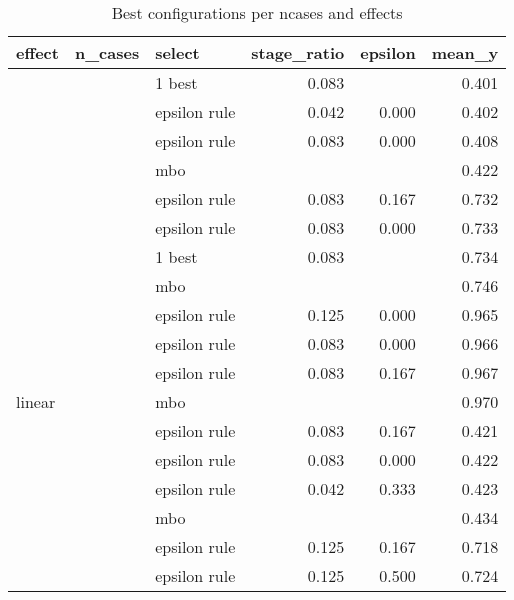 \begin{table}

\caption{\label{tab:table_best}Best configurations per ncases and effects}
\centering
\fontsize{6}{8}\selectfont
\begin{tabular}[t]{lrlrrr}
\toprule
effect & n\_cases & select & stage\_ratio & epsilon & mean\_y\\
\midrule
 &  & 1 best & 0.083 &  & 0.401\\

 &  & epsilon rule & 0.042 & 0.000 & 0.402\\

 &  & epsilon rule & 0.083 & 0.000 & 0.408\\

 & \multirow{-4}{*}{\raggedleft\arraybackslash 500} & mbo &  &  & 0.422\\
\cmidrule{2-6}
 &  & epsilon rule & 0.083 & 0.167 & 0.732\\

 &  & epsilon rule & 0.083 & 0.000 & 0.733\\

 &  & 1 best & 0.083 &  & 0.734\\

 & \multirow{-4}{*}{\raggedleft\arraybackslash 1000} & mbo &  &  & 0.746\\
\cmidrule{2-6}
 &  & epsilon rule & 0.125 & 0.000 & 0.965\\

 &  & epsilon rule & 0.083 & 0.000 & 0.966\\

 &  & epsilon rule & 0.083 & 0.167 & 0.967\\

\multirow{-12}{*}{\raggedright\arraybackslash linear} & \multirow{-4}{*}{\raggedleft\arraybackslash 2000} & mbo &  &  & 0.970\\
\cmidrule{1-6}
 &  & epsilon rule & 0.083 & 0.167 & 0.421\\

 &  & epsilon rule & 0.083 & 0.000 & 0.422\\

 &  & epsilon rule & 0.042 & 0.333 & 0.423\\

 & \multirow{-4}{*}{\raggedleft\arraybackslash 500} & mbo &  &  & 0.434\\
\cmidrule{2-6}
 &  & epsilon rule & 0.125 & 0.167 & 0.718\\

 &  & epsilon rule & 0.125 & 0.500 & 0.724\\


\end{tabular}
\end{table}
